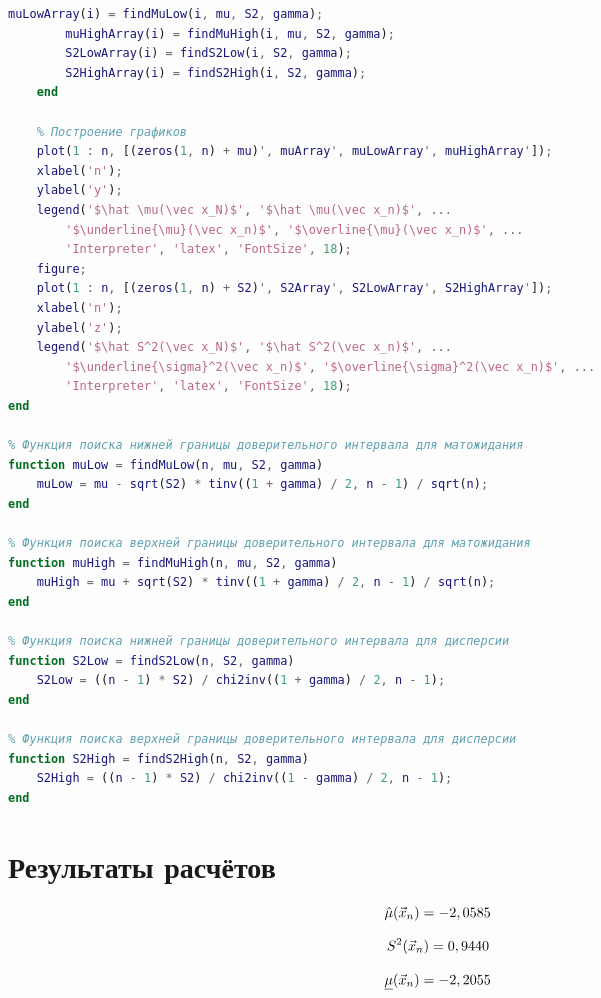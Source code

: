 \documentclass[12pt]{report}
\begin{document}
\begin{lstlisting}[language=Matlab]
		muLowArray(i) = findMuLow(i, mu, S2, gamma);
		muHighArray(i) = findMuHigh(i, mu, S2, gamma);        
		S2LowArray(i) = findS2Low(i, S2, gamma);        
		S2HighArray(i) = findS2High(i, S2, gamma);
	end
	
	% Построение графиков
	plot(1 : n, [(zeros(1, n) + mu)', muArray', muLowArray', muHighArray']);
	xlabel('n');
	ylabel('y');
	legend('$\hat \mu(\vec x_N)$', '$\hat \mu(\vec x_n)$', ...
		'$\underline{\mu}(\vec x_n)$', '$\overline{\mu}(\vec x_n)$', ...
		'Interpreter', 'latex', 'FontSize', 18);
	figure;
	plot(1 : n, [(zeros(1, n) + S2)', S2Array', S2LowArray', S2HighArray']);
	xlabel('n');
	ylabel('z');
	legend('$\hat S^2(\vec x_N)$', '$\hat S^2(\vec x_n)$', ...
		'$\underline{\sigma}^2(\vec x_n)$', '$\overline{\sigma}^2(\vec x_n)$', ...
		'Interpreter', 'latex', 'FontSize', 18);
end

% Функция поиска нижней границы доверительного интервала для матожидания
function muLow = findMuLow(n, mu, S2, gamma)
	muLow = mu - sqrt(S2) * tinv((1 + gamma) / 2, n - 1) / sqrt(n);
end

% Функция поиска верхней границы доверительного интервала для матожидания
function muHigh = findMuHigh(n, mu, S2, gamma)
	muHigh = mu + sqrt(S2) * tinv((1 + gamma) / 2, n - 1) / sqrt(n);
end

% Функция поиска нижней границы доверительного интервала для дисперсии
function S2Low = findS2Low(n, S2, gamma)
	S2Low = ((n - 1) * S2) / chi2inv((1 + gamma) / 2, n - 1);
end

% Функция поиска верхней границы доверительного интервала для дисперсии
function S2High = findS2High(n, S2, gamma)
	S2High = ((n - 1) * S2) / chi2inv((1 - gamma) / 2, n - 1);
end
\end{lstlisting}

\section*{Результаты расчётов}
\begin{equation*}
	\hat\mu(\vec x_n) = -2,0585\\
\end{equation*}

\begin{equation*}
	S^2(\vec x_n) = 0,9440\\
\end{equation*}

\begin{equation*}
	\underline\mu(\vec x_n) = -2,2055\\
\end{equation*}
\end{document}

